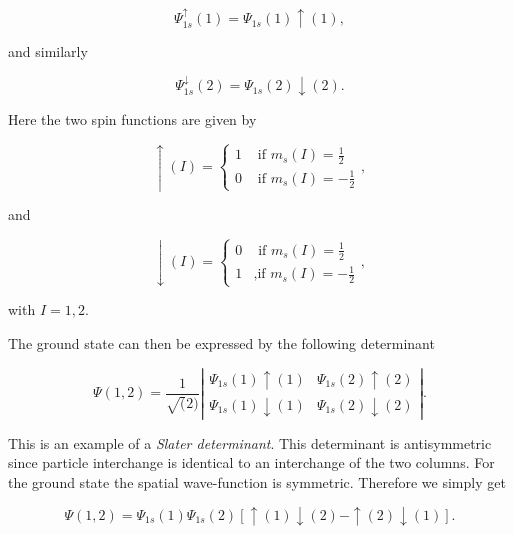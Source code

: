 \begin{equation*} 
  \Psi_{1s}^{\uparrow}(1) = \Psi_{1s}(1)\uparrow(1),
\end{equation*}
 
and similarly

\begin{equation*} 
  \Psi_{1s}^{\downarrow}(2) = \Psi_{1s}(2)\downarrow(2).
\end{equation*}

Here the two spin functions are given by 

\begin{equation*}
  \uparrow(I) = \left\{ 
  \begin{array}{cl}
    1 & \text{ if $m_s(I)=\frac{1}{2}$} \\ [4pt]
    0 & \text{ if $m_s(I)=-\frac{1}{2}$}
  \end{array}
  \right.,
\end{equation*}

and

\begin{equation}
  \downarrow(I) = \left\{ 
  \begin{array}{cl}
    0 & \text{ if $m_s(I)=\frac{1}{2}$} \\ [4pt]
    1 & \text{,if $m_s(I)=-\frac{1}{2}$}
  \end{array}
  \right.,
\label{heliumSlaterDeterminant}
\end{equation}

with $I=1,2$.

The ground state can then be expressed by the following determinant

\begin{equation*} 
  \Psi(1,2) = \frac{1}{\sqrt(2)} \left|
  \begin{array}{cc}
    \Psi_{1s}(1)\uparrow(1) & \Psi_{1s}(2)\uparrow(2) \\ [4pt]
    \Psi_{1s}(1)\downarrow(1)  & \Psi_{1s}(2)\downarrow(2)
  \end{array}
  \right|.
\end{equation*}

This is an example of a \emph{Slater determinant}. This determinant is
antisymmetric since particle interchange is identical to an
interchange of the two columns. For the ground state the spatial
wave-function is symmetric. Therefore we simply get 

\begin{equation*} 
  \Psi(1,2) = \Psi_{1s}(1) \Psi_{1s}(2) \left[ 
    \uparrow(1)\downarrow(2) - \uparrow(2) \downarrow(1) \right].
\end{equation*}

